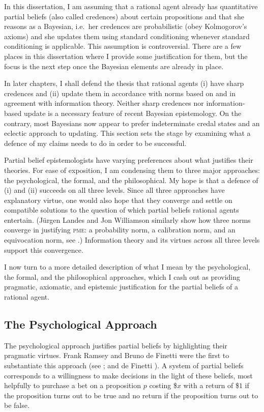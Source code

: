 \documentclass[phd,12pt,oneside]{ubcthesis}
\begin{document}
In this dissertation, I am assuming that a rational agent already has
quantitative partial beliefs (also called credences) about certain
propositions and that she reasons as a Bayesian, i.e.\ her credences
are probabilistic (obey Kolmogorov's axioms) and she updates them
using standard conditioning whenever standard conditioning is
applicable. This assumption is controversial. There are a few places
in this dissertation where I provide some justification for them, but
the focus is the next step once the Bayesian elements are already in
place. 

In later chapters, I shall defend the thesis that rational agents (i)
have sharp credences and (ii) update them in accordance with norms
based on and in agreement with information theory. Neither sharp
credences nor information-based update is a necessary feature of
recent Bayesian epistemology. On the contrary, most Bayesians now
appear to prefer indeterminate credal states and an eclectic approach
to updating. This section sets the stage by examining what a defence
of my claims needs to do in order to be successful. 

Partial belief epistemologists have varying preferences about what
justifies their theories. For ease of exposition, I am condensing them
to three major approaches: the psychological, the formal, and the
philosophical. My hope is that a defence of (i) and (ii) succeeds on
all three levels. Since all three approaches have explanatory virtue,
one would also hope that they converge and settle on compatible
solutions to the question of which partial beliefs rational agents
entertain. (J{\"u}rgen Landes and Jon Williamson similarly show how
three norms converge in justifying \textsc{pme}: a probability norm, a
calibration norm, and an equivocation norm, see
.) Information theory and its virtues
across all three levels support this convergence.

I now turn to a more detailed description of what I mean by the
psychological, the formal, and the philosophical approaches, which I
cash out as providing pragmatic, axiomatic, and epistemic
justification for the partial beliefs of a rational agent.

\subsection{The Psychological Approach}
\label{subsec:oopiasee}

The psychological approach justifies partial beliefs by highlighting
their pragmatic virtues. Frank Ramsey and Bruno de Finetti were the
first to substantiate this approach (see ; and de
Finetti ). A system of partial beliefs
corresponds to a willingness to make decisions in the light of these
beliefs, most helpfully to purchase a bet on a proposition $p$ costing
\$$x$ with a return of \$$1$ if the proposition turns out to be true
and no return if the proposition turns out to be false.
\end{document}
